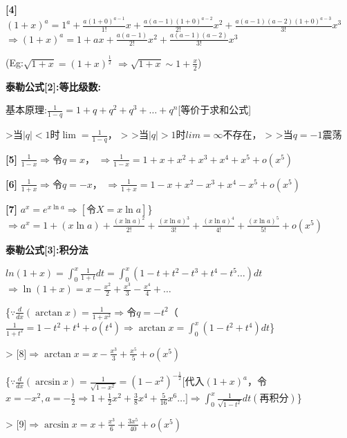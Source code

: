 \documentclass[11pt,a4paper,UTF8]{ctexart}
\begin{document}
\textbf{[4]} $(1+x)^a = 1^a + \frac{a(1+0)^{a-1}}{1!}x + \frac{a(a-1)(1+0)^{a-2}}{2!}x^2 + \frac{a(a-1)(a-2)(1+0)^{a-3}}{3!}x^3$    $\Rightarrow (1+x)^a = 1 + ax + \frac{a(a-1)}{2!}x^2 + \frac{a(a-1)(a-2)}{3!}x^3$

       (Eg:$\sqrt{1+x} = (1+x)^{\frac{1}{2}}$					$\Rightarrow \sqrt{1+x} \sim 1+\frac{x}{2}$)

    \textbf{泰勒公式[2]:等比级数:}

    基本原理:$\frac{1}{1-q} = 1 + q + q^2 + q^3 + \dots + q^n$[等价于求和公式]

\begin{solbox}[{分步推导与答题规范}]
    >当$|q|<1$时$\lim = \frac{1}{1-q}$，
    >
    >当$|q|>1$时$lim=\infty$不存在，
    >
    >当$q=-1$震荡
\end{solbox}

\textbf{[5]} $\frac{1}{1-x} \Rightarrow$令$q=x$，		 $\Rightarrow \frac{1}{1-x} = 1 + x + x^2 + x^3 + x^4 + x^5 + o(x^5)$

\textbf{[6]} $\frac{1}{1+x} \Rightarrow$令$q=-x$，		$\Rightarrow \frac{1}{1+x} = 1 - x + x^2 - x^3 + x^4 - x^5 + o(x^5)$

\textbf{[7]} $a^x = e^{x \ln a} \Rightarrow[\text{令}X = x \ln a]$\} 	$\Rightarrow a^x = 1 + (x \ln a) + \frac{(x \ln a)^2}{2!} + \frac{(x \ln a)^3}{3!} + \frac{(x \ln a)^4}{4!} + \frac{(x \ln a)^5}{5!} + o(x^5)$

    \textbf{泰勒公式[3]:积分法}

    $ln(1+x) = \int_{0}^{x} \frac{1}{1+t} dt = \int_{0}^{x} (1 - t + t^2 - t^3 + t^4 - t^5 \dots) dt$ 	$\Rightarrow \ln(1+x) = x - \frac{x^2}{2} + \frac{x^3}{3} - \frac{x^4}{4} + \dots$

    \{$\because\frac{d}{dx}(\arctan x) = \frac{1}{1+x^2} \Rightarrow$令$q=-t^2$（$\frac{1}{1+t^2} = 1 - t^2 + t^4 + o(t^4)\Rightarrow \arctan x = \int_{0}^{x} (1 - t^2 + t^4) dt$\}

\begin{solbox}[{分步推导与答题规范}]
    >   [8]$\Rightarrow \arctan x = x - \frac{x^3}{3} + \frac{x^5}{5} + o(x^5)$
\end{solbox}

    \{$\because\frac{d}{dx}(\arcsin x) = \frac{1}{\sqrt{1-x^2}} = (1-x^2)^{-\frac{1}{2}}$[代入$(1+x)^a$，令$x = -x^2, a = -\frac{1}{2} \Rightarrow 1 + \frac{1}{2}x^2 + \frac{3}{8}x^4 + \frac{5}{16}x^6 \dots ]\Rightarrow \int_{0}^{x} \frac{1}{\sqrt{1-t^2}} dt(\text{再积分})$\}

\begin{solbox}[{分步推导与答题规范}]
    >   [9]$\Rightarrow \arcsin x = x + \frac{x^3}{6} + \frac{3x^5}{40} + o(x^5)$
\end{solbox}
\end{document}
